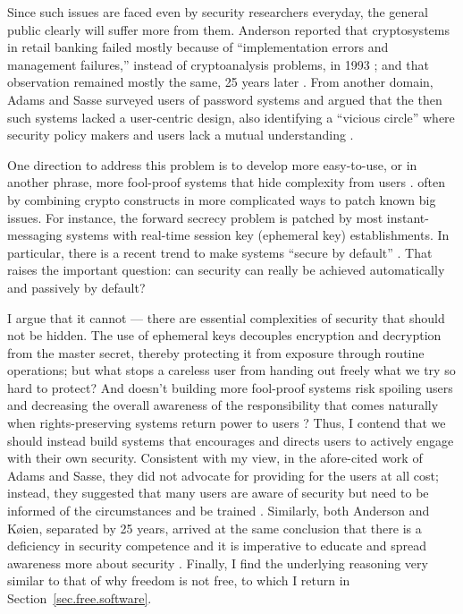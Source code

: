 \documentclass[10pt]{article}
\begin{document}
Since such issues are faced even by security researchers everyday, the general
public clearly will suffer more from them. Anderson reported that cryptosystems
in retail banking failed mostly because of ``implementation errors and
management failures,'' instead of cryptoanalysis problems, in 1993
\cite{anderson.why.cryptosys.fail}; and that observation remained mostly the
same, 25 years later \cite{why.cryptosys.fail.revisit}. From another domain,
Adams and Sasse surveyed users of password systems and argued that the
then such systems lacked a user-centric design, also identifying a ``vicious
circle'' where security policy makers and users lack a mutual understanding
\cite{users.are.not.the.enemy}. 

One direction to address this problem is to develop more easy-to-use, or in
another phrase, more fool-proof systems that hide complexity from users
\cite{secure.systems.people.can.use}. often by combining crypto constructs in
more complicated ways to patch known big issues.  For instance, the forward
secrecy problem is patched by most instant-messaging systems with real-time
session key (ephemeral key) establishments.  In particular, there is a recent
trend to make systems ``secure by default'' \cite{secure.by.default}. That
raises the important question: can security can really be achieved
automatically and passively by default?

I argue that it cannot --- there are essential complexities of security that
should not be hidden. The use of ephemeral keys decouples encryption and
decryption from the master secret, thereby protecting it from exposure through
routine operations; but what stops a careless user from handing out freely what
we try so hard to protect? And doesn't building more fool-proof systems risk
spoiling users and decreasing the overall awareness of the responsibility that
comes naturally when rights-preserving systems return power to users
\cite{usable.security.contradiction, rid.of.usability.sec.tradeoff}?  Thus, I
contend that we should instead build systems that encourages and directs
users to actively engage with their own security. Consistent with my view,
in the afore-cited work of Adams and Sasse, they did not advocate for providing
for the users at all cost; instead, they suggested that many users are aware of
security but need to be informed of the circumstances and be trained
\cite{users.are.not.the.enemy}.  Similarly, both Anderson and K\o ien,
separated by 25 years, arrived at the same conclusion that there is a
deficiency in security competence and it is imperative to educate and spread
awareness more about security \cite{anderson.why.cryptosys.fail,
why.cryptosys.fail.revisit}. Finally, I find the underlying reasoning very
similar to that of why freedom is not free, to which I return in
Section~\ref{sec.free.software}.
\end{document}
